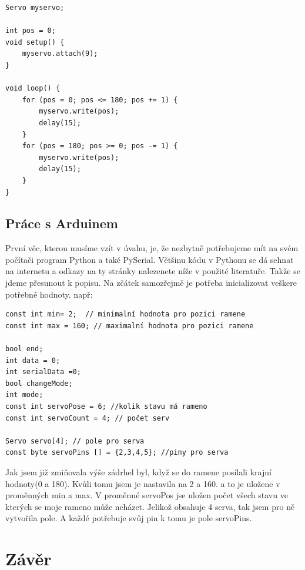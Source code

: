 \documentclass[12pt, a4paper,
twoside,        %
openright
]{report}
\begin{document}
{\begin{lstlisting}[style=Python, caption={Ukázka kódu k ověření funkčnosti}]
Servo myservo;  

int pos = 0;    
void setup() {
	myservo.attach(9);  
}

void loop() {
	for (pos = 0; pos <= 180; pos += 1) { 
		myservo.write(pos);             
		delay(15);                      
	}
	for (pos = 180; pos >= 0; pos -= 1) {
		myservo.write(pos);            
		delay(15);                       
	}
}
\end{lstlisting}

\newpage

\section{Práce s Arduinem}

První věc, kterou musíme vzít v úvahu, je, že nezbytně potřebujeme mít na svém počítači program Python a také PySerial. Většinu kódu v Pythonu se dá sehnat na internetu a odkazy na ty stránky nalezenete níže v použité literatuře. 
Takže se jdeme přesunout k popisu.
Na zčátek samozřejmě je potřeba inicializovat veškere potřebné hodnoty.
např:

\begin{lstlisting}[style=Python, caption={Inicializace potřebných hodnot}]
const int min= 2;  // minimalní hodnota pro pozici ramene
const int max = 160; // maximalní hodnota pro pozici ramene

bool end;
int data = 0;
int serialData =0;
bool changeMode;
int mode;
const int servoPose = 6; //kolik stavu má rameno
const int servoCount = 4; // počet serv

Servo servo[4]; // pole pro serva 
const byte servoPins [] = {2,3,4,5}; //piny pro serva
\end{lstlisting}


Jak jsem již zmiňovala výše zádrhel byl, když se do ramene posílali krajní hodnoty(0 a 180). Kvůli tomu jsem je nastavila na 2 a 160. a to je uložene v proměnných min a max.
V proměnné servoPos jse uložen počet všech stavu ve kterých se moje rameno může ncházet.
Jelikož obsahuje 4 serva, tak jsem pro ně vytvořila pole. A každé potřebuje svůj pin k tomu je pole servoPins.



	
	

	
	\chapter*{Závěr}
	
}
\end{document}
